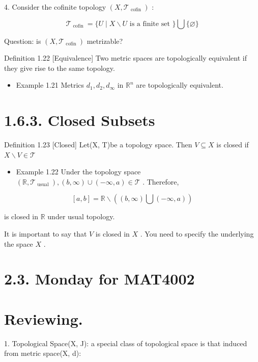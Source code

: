 4. Consider the cofinite topology \(\left( {X,{\mathcal{T}}_{\text{ cofin }}}\right)\) :

\[
{\mathcal{T}}_{\text{ cofin }} = \{ U \mid  X \smallsetminus  U\text{ is a finite set }\} \bigcup \{ \varnothing \}
\]

Question: is \(\left( {X,{\mathcal{T}}_{\text{ cofin }}}\right)\) metrizable?

Definition 1.22 [Equivalence] Two metric spaces are topologically equivalent if they give rise to the same topology.

\begin{itemize}
\item Example 1.21 Metrics \({d}_{1},{d}_{2},{d}_{\infty }\) in \({\mathbb{R}}^{n}\) are topologically equivalent.
\end{itemize}

\section*{1.6.3. Closed Subsets}

Definition 1.23 [Closed] Let(X, T)be a topology space. Then \(V \subseteq  X\) is closed if \(X \smallsetminus  V \in  \mathcal{T}\)

\begin{itemize}
\item Example 1.22 Under the topology space \(\left( {\mathbb{R},{\mathcal{T}}_{\text{ usual }}}\right) ,\left( {b,\infty }\right)  \cup  \left( {-\infty ,a}\right)  \in  \mathcal{T}\) . Therefore,
\end{itemize}

\[
\left\lbrack  {a,b}\right\rbrack   = \mathbb{R} \smallsetminus  \left( {\left( {b,\infty }\right) \bigcup \left( {-\infty ,a}\right) }\right)
\]

is closed in \(\mathbb{R}\) under usual topology.

It is important to say that \(V\) is closed in \(X\) . You need to specify the underlying the space \(X\) .

\section*{2.3. Monday for MAT4002}

\section*{Reviewing.}

1. Topological Space(X, J): a special class of topological space is that induced from metric space(X, d):

